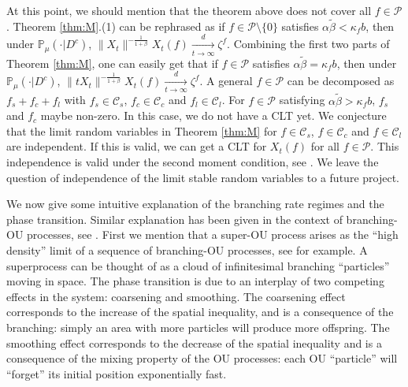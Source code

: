 \documentclass[EJP]{ejpecp} %
\begin{document}
	At this point, we should mention that the theorem above does not cover all $f\in \mathcal P$.
	Theorem \ref{thm:M}.(1) can be rephrased as if $f\in \mathcal P\setminus\{0\}$ satisfies   $\alpha \tilde \beta < \kappa_f b$, then  under $\mathbb{P}_{\mu}(\cdot|D^c)$, $\|X_t\|^{- \frac{1}{1+\beta}} X_t(f)  \xrightarrow[t\to \infty]{d} \zeta^f$.
	Combining the first two parts of Theorem \ref{thm:M}, one can easily get that  if $f\in \mathcal P$ satisfies   $\alpha \tilde \beta = \kappa_f b$, then  under $\mathbb{P}_{\mu}(\cdot|D^c)$, $\|t X_t\|^{-\frac{1}{1+\beta}} X_t(f) \xrightarrow[t\to \infty]{d} \zeta^f$.
	A general  $f \in \mathcal P$ can be decomposed as $f_s + f_c + f_l$ with $f_s \in \mathcal C_s$, $f_c \in \mathcal C_c$ and $f_l \in \mathcal C_l$. 
	For $f\in  \mathcal P$ satisfying $\alpha \tilde \beta > \kappa_f b$, $f_s$ and $f_c$ 
	maybe non-zero.
	In this case, we do not have a CLT yet.
	We conjecture that the limit random variables in Theorem \ref{thm:M} for $ f\in \mathcal C_s$, $f\in \mathcal C_c$ and $ f\in \mathcal C_l$ are independent. If this is valid, we can get a CLT for $ X_t(f)$ for all $f\in  \mathcal P$.
	This independence is valid  under the second moment condition, see \cite{RenSongZhang2015Central}.
	We leave the question of independence of the limit stable random variables to a future project.

	We now give some intuitive explanation of the branching rate regimes and the  phase transition.
	Similar explanation has been given in the context of branching-OU processes, see \cite{MarksMilos2018CLT}.
	First we mention that a super-OU process arises as the ``high density'' limit of a sequence of branching-OU processes, see \cite{Li2011Measure-valued} for example. A superprocess can be thought of as a cloud of infinitesimal branching ``particles'' moving in space.
	The phase transition is due to an interplay of two competing effects in the system: coarsening and smoothing.
	The coarsening effect corresponds to the increase of the spatial inequality, and is a consequence of the branching: simply an area with more particles will produce more offspring.
	The smoothing effect corresponds to the decrease of the spatial inequality and is a consequence of the mixing property of the OU processes: each OU ``particle'' will ``forget'' its initial position exponentially fast.
\end{document}
